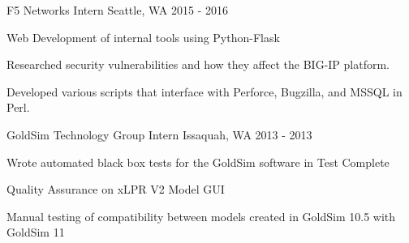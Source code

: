 \begin{cventries}
  \cventry
    {F5 Networks} %
    {Intern} %
    {Seattle, WA} %
    {2015 - 2016} %
    {
      \begin{cvitems} %
        \item {Web Development of internal tools using Python-Flask}
        \item {Researched security vulnerabilities and how they affect the BIG-IP platform.}
        \item {Developed various scripts that interface with Perforce, Bugzilla, and MSSQL in Perl.}
      \end{cvitems}
    }

  \cventry
    {GoldSim Technology Group} %
    {Intern} %
    {Issaquah, WA} %
    {2013 - 2013} %
    {
      \begin{cvitems} %
        \item {Wrote automated black box tests for the GoldSim software in Test Complete}
        \item {Quality Assurance on xLPR V2 Model GUI}
        \item {Manual testing of compatibility between models created in GoldSim 10.5 with GoldSim 11}
      \end{cvitems}
    }

\end{cventries}
